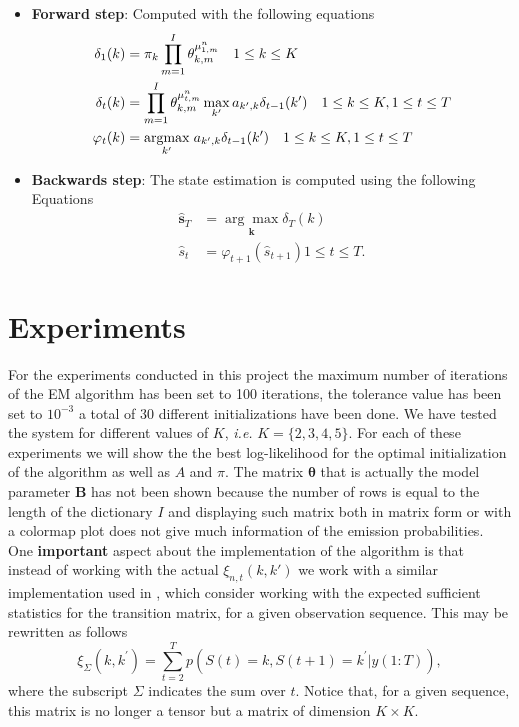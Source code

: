 \documentclass[12pt]{article}
\begin{document}
\begin{itemize}
	\item \textbf{Forward step}: Computed with the following equations
	\begin{align}
	\delta_{1}(k)&=\pi_{k} \prod\limits_{m=1}^{I}\theta_{k,m}^{\mu^{n}_{1,m}} \quad 1 \leq k \leq K\\
	\delta_{t}(k)&=\prod\limits_{m=1}^{I}\theta_{k,m}^{\mu^{n}_{t,m}} \max _{k'} a_{k',k} \delta_{t-1}(k') \quad 1 \leq k \leq K , 1 \leq t \leq T \\
	\varphi_{t}(k)&=\underset{k'}{\operatorname{argmax}} \hspace{0.1cm}a_{k',k} \delta_{t-1}(k') \quad 1 \leq k \leq K , 1 \leq t \leq T \\
	\end{align}
	\item \textbf{Backwards step}: The state estimation is computed using the following Equations
	\begin{align}
	\hat{\mathbf{s}}_{T}&=\underset{\boldsymbol{k}}{\arg \max } \delta_{T}(k)\\
	\hat{s}_{t}&=\varphi_{t+1}\left(\hat{s}_{t+1}\right)  1 \leq t \leq T.
	\end{align} 
\end{itemize}

\section{Experiments}
For the experiments conducted in this project the maximum number of iterations of the EM algorithm has been set to 100 iterations, the tolerance value has been set to $10^{-3}$ a total of 30 different initializations have been done. We have tested the system for different values of $K$, \emph{i.e.} $K = \{2,3,4,5\}$. For each of these experiments we will show the the best log-likelihood for the optimal initialization of the algorithm as well as $A$ and $\pi$. The matrix $\boldsymbol{\theta}$ that is actually the model parameter $\mathbf{B}$ has not been shown because the number of rows is equal to the length of the dictionary $I$ and displaying such matrix both in matrix form or with a colormap plot does not give much information of the emission probabilities. \\

\noindent One \textbf{important} aspect about the implementation of the algorithm is that instead of working with the actual $\xi _ { n,t } ( k , k' )$ we work with a similar implementation used in \cite{murphy2012machine}, which consider working with the expected sufficient statistics for the transition matrix, for a given observation sequence. This may be rewritten as follows
\begin{equation}
\xi_\Sigma(k,k^{\prime}) = \sum\limits_{t=2}^{T} p(S(t) = k, S(t+1) = k^{\prime} | y(1:T)),
\end{equation}
where the subscript $\Sigma$ indicates the sum over $t$. Notice that, for a given sequence, this matrix is no longer a tensor but a matrix of dimension $K\times K$.
\end{document}
